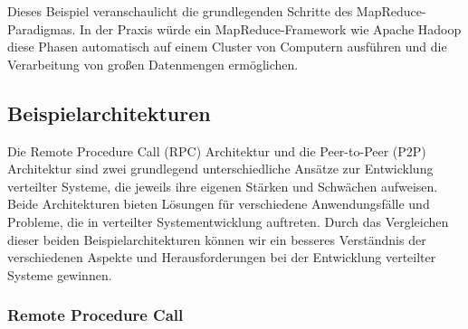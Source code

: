\documentclass[../vs-script-first-v01.tex]{subfiles}
\begin{document}
Dieses Beispiel veranschaulicht die grundlegenden Schritte des MapReduce-Paradigmas. In der Praxis würde ein MapReduce-Framework wie Apache Hadoop diese Phasen automatisch auf einem Cluster von Computern ausführen und die Verarbeitung von großen Datenmengen ermöglichen.

\newpage
\subsection{Beispielarchitekturen}
Die Remote Procedure Call (RPC) Architektur und die Peer-to-Peer (P2P) Architektur sind zwei grundlegend unterschiedliche Ansätze zur Entwicklung verteilter Systeme, die jeweils ihre eigenen Stärken und Schwächen aufweisen. Beide Architekturen bieten Lösungen für verschiedene Anwendungsfälle und Probleme, die in verteilter Systementwicklung auftreten. Durch das Vergleichen dieser beiden Beispielarchitekturen können wir ein besseres Verständnis der verschiedenen Aspekte und Herausforderungen bei der Entwicklung verteilter Systeme gewinnen.
\subsubsection{Remote Procedure Call}
\end{document}
